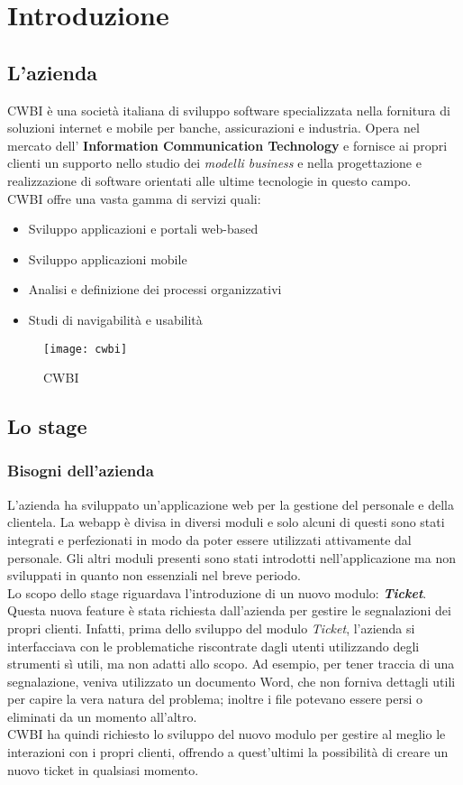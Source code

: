 \chapter{Introduzione}
\label{cap:introduzione}

\section{L'azienda}

CWBI è una società italiana di sviluppo software specializzata nella fornitura di soluzioni internet e mobile per banche, assicurazioni e industria. Opera nel mercato dell' \textbf{Information Communication Technology} e fornisce ai propri clienti un supporto nello studio dei \textit{modelli business} e nella progettazione e realizzazione di software orientati alle ultime tecnologie in questo campo.\\
CWBI offre una vasta gamma di servizi quali:
\begin{itemize}
\item Sviluppo applicazioni e portali web-based
\item Sviluppo applicazioni mobile
\item Analisi e definizione dei processi organizzativi
\item Studi di navigabilità e usabilità
\end{itemize}  
\begin{figure}[!h]
     \centering
     \texttt{[image: cwbi]}
     \caption{CWBI}
\end{figure}

\section{Lo stage}
\subsection{Bisogni dell'azienda}
L'azienda ha sviluppato un'applicazione web per la gestione del personale e della clientela. La webapp è divisa in diversi moduli e solo alcuni di questi sono stati integrati e perfezionati in modo da poter essere utilizzati attivamente dal personale. Gli altri moduli presenti sono stati introdotti nell'applicazione ma non sviluppati in quanto non essenziali nel breve periodo. \\
Lo scopo dello stage riguardava l'introduzione di un nuovo modulo: \textbf{\textit{Ticket}}. Questa nuova feature è stata richiesta dall'azienda per gestire le segnalazioni dei propri clienti. Infatti, prima dello sviluppo del modulo \textit{Ticket}, l'azienda si interfacciava con le problematiche riscontrate dagli utenti utilizzando degli strumenti sì utili, ma non adatti allo scopo. Ad esempio, per tener traccia di una segnalazione, veniva utilizzato un documento Word, che non forniva dettagli utili per capire la vera natura del problema; inoltre i file potevano essere persi o eliminati da un momento all'altro. \\
CWBI ha quindi richiesto lo sviluppo del nuovo modulo per gestire al meglio le interazioni con i propri clienti, offrendo a quest'ultimi la possibilità di creare un nuovo ticket in qualsiasi momento.
